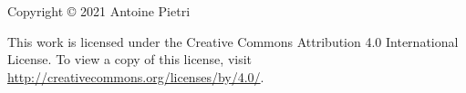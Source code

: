\documentclass[a4paper, 11pt]{memoir}
\begin{document}



\backmatter

\clearpage
\printglossary[nogroupskip=true,type=\acronymtype]

{%
  \sloppy
  \printbibliography
}


\clearemptydoublepage
\newpage
\thispagestyle{empty}
\vspace*{\fill}
\begin{center}
    Copyright \copyright{} 2021 Antoine Pietri

    This work is licensed under the Creative Commons Attribution 4.0
    International License. To view a copy of this license, visit
    \url{http://creativecommons.org/licenses/by/4.0/}.
\end{center}
\end{document}
